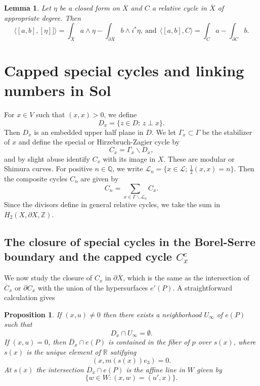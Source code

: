 \documentclass[12pt,leqno]{amsart}
\numberwithin{equation}{section}
\theoremstyle{plain}
\newtheorem{lemma}[theorem]{Lemma}
\newtheorem{proposition}[theorem]{Proposition}
\theoremstyle{definition}
\theoremstyle{remark}
\newcommand{\R}{\mathbb{R}}
\newcommand{\Q}{\mathbb{Q}}
\newcommand{\Z}{\mathbb{Z}}
\newcommand{\G}{\Gamma}
\newcommand{\back}{\backslash}
\newcommand{\calL}{\mathcal{L}}
\begin{document}
\begin{lemma}\label{integralformula}
Let $\eta$ be a closed form on $\overline{X}$ and $C$ a relative cycle in $\overline{X}$ of appropriate degree. Then 
$$
\langle[a, b], [\eta]]\rangle 
= \int_{\overline{X}}a\wedge \eta - \int_{\partial \overline{X}} b \wedge i^*\eta, \ \text{and} \ \  
\langle [a,b],C \rangle =  \int_{C}a - \int_{\partial C} b.$$
\end{lemma}







\section{Capped special cycles and linking numbers in Sol}\label{capped-cycles}

For $x \in V$ such that $(x,x)>0$, we define 
\[
D_x =\{ z \in D; \, z \perp x \}.
\]
Then $D_x$ is an embedded upper half plane in $D$. We let $\G_x \subset \G$ be the stabilizer of $x$ and define the special or Hirzebruch-Zagier cycle by 
\[
C_x = \G_x \back D_x, 
\]
and by slight abuse identify $C_x$ with its image in $X$. These are modular or Shimura curves. For positive $n \in \Q$, we write $\calL_n = \{ x \in \mathcal{L}; \, \tfrac12(x,x)= n\}$. Then the composite cycles $C_n$ are given by
\[
C_n= \sum_{x \in \G \back \calL_n} C_x.
\]
Since the divisors define in general relative cycles, we take the sum in $H_2(X,\partial X,\Z)$. 






\subsection{The closure of special cycles in the Borel-Serre boundary and the capped cycle $C_x^c$}

We now study the closure of $C_x$ in $\partial \overline{X}$, which is the same as the intersection of $\overline{C}_x$ or $\partial C_x$ with the union of the hypersurfaces $e'(P)$. A straightforward calculation gives 

\begin{proposition}\label{boundaryofC}
If $(x,u) \neq 0$ then there exists a neighborhood $U_{\infty}$ of $e(P)$ such that
$$
D_x \cap U_{\infty} = \emptyset.
$$
If $(x,u) = 0$, then $\overline{D}_x \cap e(P)$ is contained in the fiber of $p$ over $s(x)$, where $s(x)$ is the unique element of $\R$ satifying
\[
(x, m(s(x)) e_3) = 0.
\]
At $s(x)$ the intersection $\overline{D}_x \cap e(P)$ is the affine line in $W$ given by 
\[
\{ w \in W: (x,w) = (u',x)\}.
\]
\end{proposition}
\end{document}
